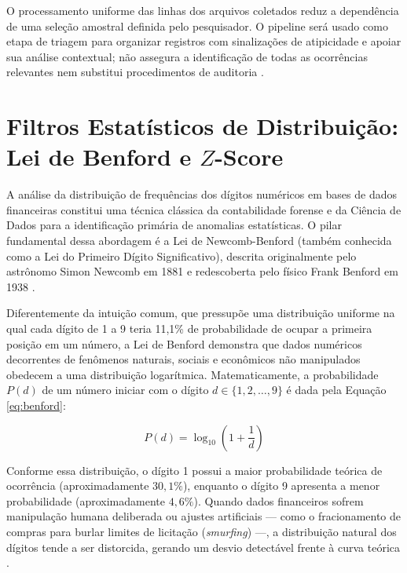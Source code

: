 \documentclass[
    12pt,               %
    openright,          %
    oneside,            %
    a4paper,            %
    chapter=TITLE,      %
    sumario=tradicional,%
    english,            %
    brazilian,          %
 ]{abntex2}
\begin{document}
O processamento uniforme das linhas dos arquivos coletados reduz a dependência de uma seleção amostral definida pelo pesquisador. O pipeline será usado como etapa de triagem para organizar registros com sinalizações de atipicidade e apoiar sua análise contextual; não assegura a identificação de todas as ocorrências relevantes nem substitui procedimentos de auditoria \cite{pereira2025}.

\section{Filtros Estatísticos de Distribuição: Lei de Benford e $Z$-Score}\label{sec:benford_zscore}

A análise da distribuição de frequências dos dígitos numéricos em bases de dados financeiras constitui uma técnica clássica da contabilidade forense e da Ciência de Dados para a identificação primária de anomalias estatísticas. O pilar fundamental dessa abordagem é a Lei de Newcomb-Benford (também conhecida como a Lei do Primeiro Dígito Significativo), descrita originalmente pelo astrônomo Simon Newcomb em 1881 e redescoberta pelo físico Frank Benford em 1938 \cite{nigrini2012, pereira2025}.

Diferentemente da intuição comum, que pressupõe uma distribuição uniforme na qual cada dígito de 1 a 9 teria 11,1\% de probabilidade de ocupar a primeira posição em um número, a Lei de Benford demonstra que dados numéricos decorrentes de fenômenos naturais, sociais e econômicos não manipulados obedecem a uma distribuição logarítmica. Matematicamente, a probabilidade $P(d)$ de um número iniciar com o dígito $d \in \{1, 2, \dots, 9\}$ é dada pela Equação \ref{eq:benford}:

\begin{equation}\label{eq:benford}
P(d) = \log_{10}\left(1 + \frac{1}{d}\right)
\end{equation}

Conforme essa distribuição, o dígito 1 possui a maior probabilidade teórica de ocorrência (aproximadamente $30,1\%$), enquanto o dígito 9 apresenta a menor probabilidade (aproximadamente $4,6\%$). Quando dados financeiros sofrem manipulação humana deliberada ou ajustes artificiais — como o fracionamento de compras para burlar limites de licitação (\textit{smurfing}) —, a distribuição natural dos dígitos tende a ser distorcida, gerando um desvio detectável frente à curva teórica \cite{nigrini2012, cavalcanti2014}.
\end{document}
